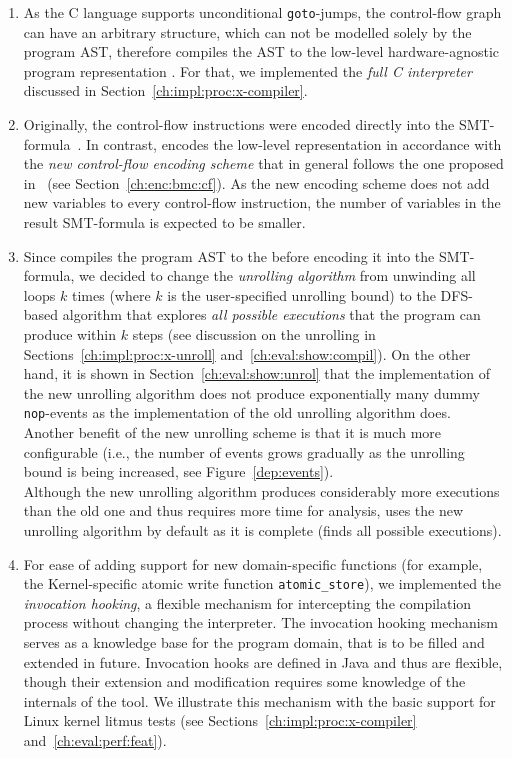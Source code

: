\begin{enumerate}[label=\arabic*.]
\begin{enumerate}[leftmargin=\parindent,label=\alph*.]
  \item As the C language supports unconditional \texttt{goto}-jumps, the control-flow graph can have an arbitrary structure, which can not be modelled solely by the program AST, therefore \porthos[2] compiles the AST to the low-level hardware-agnostic program representation \xgraph{}.
  For that, we implemented the \textit{full C interpreter} discussed in Section~\ref{ch:impl:proc:x-compiler}.
  
  \item Originally, the control-flow instructions were encoded directly into the SMT-formula~\cite{Porthos17a}.
  In contrast, \porthos[2] encodes the low-level \xgraph{} representation in accordance with the \textit{new control-flow encoding scheme} that in general follows the one proposed in~\cite[Chapter 5.1.2]{heljanko2008unfoldings} (see Section~\ref{ch:enc:bmc:cf}).
  As the new encoding scheme does not add new variables to every control-flow instruction, the number of variables in the result SMT-formula is expected to be smaller.
  
  \item Since \porthos[2] compiles the program AST to the \xgraph{} before encoding it into the SMT-formula, we decided to change the \textit{unrolling algorithm} from unwinding all loops $k$ times (where $k$ is the user-specified unrolling bound) to the DFS-based algorithm that explores \textit{all possible executions} that the program can produce within $k$ steps (see discussion on the unrolling in Sections~\ref{ch:impl:proc:x-unroll} and~\ref{ch:eval:show:compil}).
  On the other hand, it is shown in Section~\ref{ch:eval:show:unrol} that the implementation of the new unrolling algorithm does not produce exponentially many dummy \texttt{nop}-events as the implementation of the old unrolling algorithm does.
  Another benefit of the new unrolling scheme is that it is much more configurable (i.e., the number of events grows gradually as the unrolling bound is being increased, see Figure~\ref{dep:events}). \\
  Although the new unrolling algorithm produces considerably more executions than the old one and thus requires more time for analysis, \porthos[2] uses the new unrolling algorithm by default as it is complete (finds all possible executions).

  \item For ease of adding support for new domain-specific functions (for example, the Kernel-specific atomic write function \texttt{atomic\_store}), we implemented the \textit{invocation hooking}, a flexible mechanism for intercepting the compilation process without changing the interpreter.
  The invocation hooking mechanism serves as a knowledge base for the program domain, that is to be filled and extended in future.
  Invocation hooks are defined in Java and thus are flexible, though their extension and modification requires some knowledge of the internals of the tool.
  We illustrate this mechanism with the basic support for Linux kernel litmus tests (see Sections~\ref{ch:impl:proc:x-compiler} and~\ref{ch:eval:perf:feat}).


\end{enumerate}
\end{enumerate}
